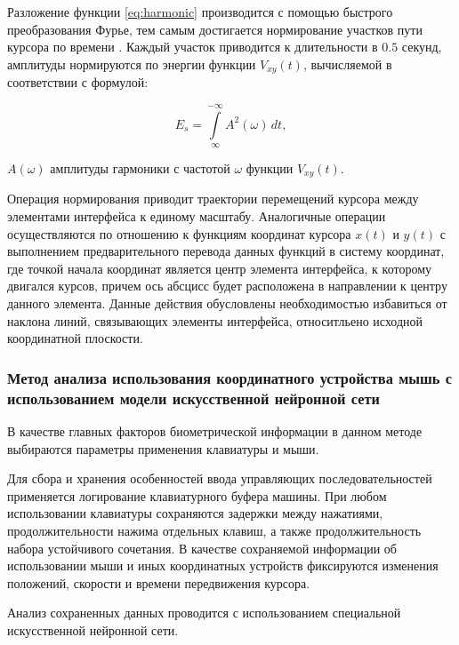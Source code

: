 Разложение функции \eqref{eq:harmonic} производится с помощью быстрого преобразования Фурье, тем самым достигается нормирование участков пути курсора по времени \cite{mouseMethod}. Каждый участок приводится к длительности в $0.5$ секунд, амплитуды нормируются по энергии функции $V_{xy}(t)$, вычисляемой в соответствии с формулой:

\begin{equation}
\label{eq:normir}
E_s = \int\limits_{\infty}^{-\infty} A^2(\omega)\,dt,
\end{equation}
\begin{eqexpl}[15mm]
\item{$A(\omega)$} амплитуды гармоники с частотой $\omega$ функции $V_{xy}(t)$.
\end{eqexpl}

Операция нормирования приводит траектории перемещений курсора между элементами интерфейса к единому масштабу. Аналогичные операции осуществляются по отношению к функциям координат курсора $x(t)$ и $y(t)$ с выполнением предварительного перевода данных функций в систему координат, где точкой начала координат является центр элемента интерфейса, к которому двигался курсов, причем ось абсцисс будет расположена в направлении к центру данного элемента. Данные действия обусловлены необходимостью избавиться от наклона линий, связывающих элементы интерфейса, относитльено исходной координатной плоскости. \cite{mouseMethod}

\subsubsection{Метод анализа использования координатного устройства \newline мышь с использованием модели искусственной нейронной сети}
В качестве главных факторов биометрической информации в данном методе выбираются параметры применения клавиатуры и мыши. \cite{neuroFatigue}

Для сбора и хранения особенностей ввода управляющих последовательностей применяется логирование клавиатурного буфера машины. При любом использовании клавиатуры сохраняются задержки между нажатиями, продолжительности нажима отдельных клавиш, а также продолжительность набора устойчивого сочетания. В качестве сохраняемой информации об использовании мыши и иных координатных устройств фиксируются изменения положений, скорости и времени передвижения курсора. \cite{neuroFatigue}

Анализ сохраненных данных проводится с использованием специальной искусственной нейронной сети. \cite{neuroFatigue}

